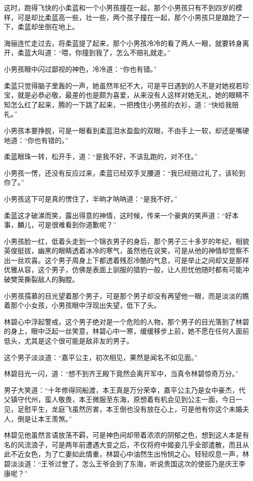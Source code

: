 这时，跑得飞快的小柔蓝和一个小男孩撞在一起，那个小男孩只有不到四岁的模样，可是却比柔蓝高一些，壮一些，两个孩子撞在一起，那个小男孩只是踉跄了一下，柔蓝却坐倒在地上。

海骊连忙走过去，将柔蓝提了起来，那个小男孩冷冷的看了两人一眼，就要转身离开，柔蓝大叫道：“喂，你撞到我了，怎么不赔礼就走。”

小男孩眼中闪过鄙视的神色，冷冷道：“你也有错。”

柔蓝只觉得脑子里轰的一声，她虽然年纪不大，可是平日遇到的人不是对她视若珍宝，就是必恭必敬，最差的也是颇为喜爱，从来没有人这样对她无礼，她的眼睛不知怎么红了起来，腾的一下跳了起来，一把拽住小男孩的衣衫，道：“快给我赔礼。”

小男孩本要挣脱，可是一眼看到柔蓝泪水盈盈的双眼，不由手上一软，却还是嘴硬地道：“你也有错的。”

柔蓝眼珠一转，松开手，道：“是我不好，不该乱跑的，对不住。”

小男孩一愣，还没有反应过来，柔蓝已经双手叉腰道：“我已经赔过礼了，该轮到你了。”

小男孩这下可是真的愣住了，半晌才呐呐道：“是我不好。”

柔蓝这才破涕而笑，露出得意的神情，这时候，传来一个豪爽的笑声道：“好本事，麟儿，可是很难看到你道歉呢？”

小男孩脸一红，低着头走到一个锦衣男子的身后，那个男子三十多岁的年纪，相貌英俊挺拔，幽黑的眼睛透着冰冷的寒气，虽然他在说笑，可是从他的神情却觉察不出一丝欢喜。这个男子周身上下都透着残忍冷酷的气息，可是举止之间却又是那样优雅从容，这个男子，仿佛是表面上驯服的猎豹一般，让人担忧他随时都有可能冲破樊笼撕裂敌人的胸膛。

小男孩孺慕的目光望着那个男子，可是那个男子却没有再望他一眼，而是淡淡的瞧着那个小女孩，小男孩眼中浮现出失望，低下了头。

林碧心中浮起警戒，这个男子绝对是一个危险的人物，那个男子的目光落到了林碧的身上，眼中泛起一丝笑意，林碧心中一寒，缓缓移步上前，她不愿在任何人面前低头，尤其是这个很可能是敌非友的男子。

这个男子淡淡道：“嘉平公主，初次相见，果然是闻名不如见面。”

林碧目光一闪，道：“想不到齐王殿下竟然会离开军中，当真令林碧惊奇万分。”

男子大笑道：“十年修得同船渡，本王真是万分荣幸，嘉平公主乃是女中豪杰，代父镇守代州，蛮人敬畏，本王微服至东海，原想着有机会见到公主一面，今日一见，足慰平生，龙庭飞虽然厉害，本王倒也没有放在心上，可是他有你这个未婚夫人，倒是让本王羡煞。”

林碧见他虽然言语放荡不羁，可是神色间却带着浓浓的阴郁之色，想到这人本是有名的风流浪子，可是两年前遭遇大变之后，不仅将府中姬妾几乎全部遣散，而且从此不近女色，为了亡妻如此情重，林碧心中油然生出怜悯之心。轻轻叹息一声，林碧淡淡道：“王爷过誉了，怎么王爷会到了东海，听说贵国这次的使臣乃是庆王李康呢？”

